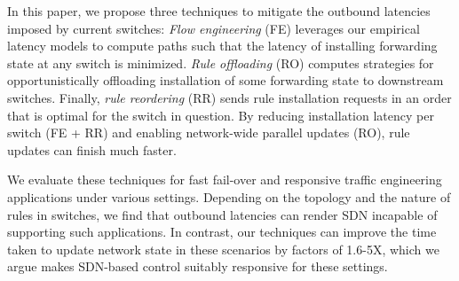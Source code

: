 In this paper, we propose three techniques to mitigate the outbound latencies
imposed by current switches:
{\em Flow engineering} (FE) leverages our empirical latency models to compute
paths such that the latency of installing forwarding state at any
switch is minimized. 
{\em Rule
  offloading} (RO) computes strategies for opportunistically
offloading installation of some forwarding state to downstream switches.
Finally, {\em rule reordering} (RR) sends rule installation
requests in an order that is optimal for the switch in question. By reducing
installation latency per switch (FE + RR) and enabling network-wide parallel
updates (RO), 
rule updates can finish much faster.

 We evaluate these techniques for fast fail-over and responsive
 traffic engineering applications under various settings. Depending on
 the topology and the nature of rules in switches, we find that
outbound latencies can render SDN incapable of supporting such
applications. In contrast, 
our techniques can
 improve the time taken to update network state in these scenarios by factors
 of 1.6-5X, which we argue makes SDN-based control suitably responsive for these
 settings.







